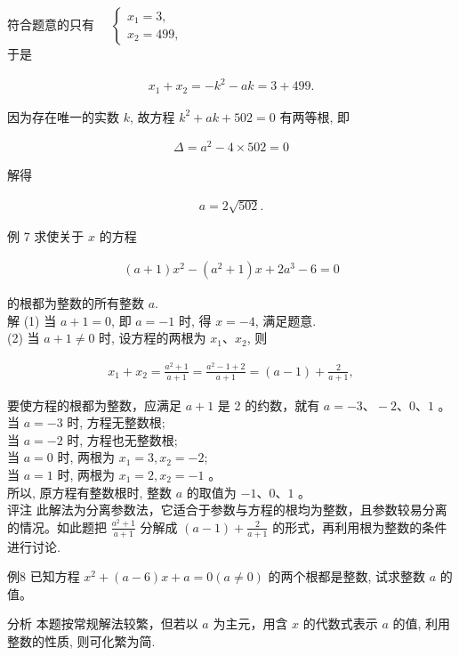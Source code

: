 \documentclass[10pt]{article}
\begin{document}
符合题意的只有 $\quad\left\{\begin{array}{l}x_{1}=3, \\ x_{2}=499,\end{array}\right.$\\
于是

\begin{align*}
x_{1}+x_{2}=-k^{2}-a k=3+499 .
\end{align*}

因为存在唯一的实数 $k$, 故方程 $k^{2}+a k+502=0$ 有两等根, 即

\begin{align*}
\Delta=a^{2}-4 \times 502=0
\end{align*}

解得

\begin{align*}
a=2 \sqrt{502} .
\end{align*}

例 7 求使关于 $x$ 的方程

\begin{align*}
(a+1) x^{2}-\left(a^{2}+1\right) x+2 a^{3}-6=0
\end{align*}

的根都为整数的所有整数 $a$.\\
解 (1) 当 $a+1=0$, 即 $a=-1$ 时, 得 $x=-4$, 满足题意.\\
(2) 当 $a+1 \neq 0$ 时, 设方程的两根为 $x_{1} 、 x_{2}$, 则

\begin{align*}
x_{1}+x_{2}=\frac{a^{2}+1}{a+1}=\frac{a^{2}-1+2}{a+1}=(a-1)+\frac{2}{a+1},
\end{align*}

要使方程的根都为整数，应满足 $a+1$ 是 2 的约数，就有 $a=-3 、-2 、 0 、 1$ 。\\
当 $a=-3$ 时, 方程无整数根;\\
当 $a=-2$ 时, 方程也无整数根;\\
当 $a=0$ 时, 两根为 $x_{1}=3, x_{2}=-2$;\\
当 $a=1$ 时, 两根为 $x_{1}=2, x_{2}=-1$ 。\\
所以, 原方程有整数根时, 整数 $a$ 的取值为 $-1 、 0 、 1$ 。\\
评注 此解法为分离参数法，它适合于参数与方程的根均为整数，且参数较易分离的情况。如此题把 $\frac{a^{2}+1}{a+1}$ 分解成 $(a-1)+\frac{2}{a+1}$ 的形式，再利用根为整数的条件进行讨论.

例8 已知方程 $x^{2}+(a-6) x+a=0(a \neq 0)$ 的两个根都是整数, 试求整数 $a$ 的值。

分析 本题按常规解法较繁，但若以 $a$ 为主元，用含 $x$ 的代数式表示 $a$ 的值, 利用整数的性质, 则可化繁为简.
\end{document}
